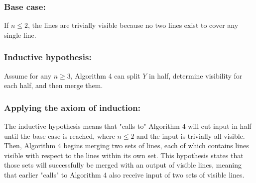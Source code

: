 \documentclass{article}
\begin{document}
    \subsubsection*{Base case:}
    If $n \leq 2$, the lines are trivially visible because no two lines exist to cover any single line.
    \subsubsection*{Inductive hypothesis:}
    Assume for any $n \geq 3$, Algorithm 4 can split $Y$ in half, determine visibility for each half, and then merge them.
    \subsubsection*{Applying the axiom of induction:}
    The inductive hypothesis means that "calls to" Algorithm 4 will cut input in half until the base case is reached, where $n \leq 2$ and the input is trivially all visible. Then, Algorithm 4 begins merging two sets of lines, each of which contains lines visible with respect to the lines within its own set. This hypothesis states that those sets will successfully be merged with an output of visible lines, meaning that earlier "calls" to Algorithm 4 also receive input of two sets of visible lines.
    
\end{document}
